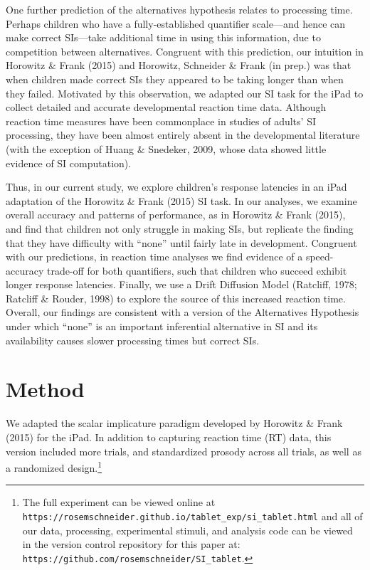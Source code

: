 \documentclass[10pt, letterpaper]{article}
\begin{document}
One further prediction of the alternatives hypothesis relates to
processing time. Perhaps children who have a fully-established
quantifier scale---and hence can make correct SIs---take additional time
in using this information, due to competition between alternatives.
Congruent with this prediction, our intuition in Horowitz \& Frank
(2015) and Horowitz, Schneider \& Frank (in prep.) was that when
children made correct SIs they appeared to be taking longer than when
they failed. Motivated by this observation, we adapted our SI task for
the iPad to collect detailed and accurate developmental reaction time
data. Although reaction time measures have been commonplace in studies
of adults' SI processing, they have been almost entirely absent in the
developmental literature (with the exception of Huang \& Snedeker, 2009,
whose data showed little evidence of SI computation).

Thus, in our current study, we explore children's response latencies in
an iPad adaptation of the Horowitz \& Frank (2015) SI task. In our
analyses, we examine overall accuracy and patterns of performance, as in
Horowitz \& Frank (2015), and find that children not only struggle in
making SIs, but replicate the finding that they have difficulty with
``none'' until fairly late in development. Congruent with our
predictions, in reaction time analyses we find evidence of a
speed-accuracy trade-off for both quantifiers, such that children who
succeed exhibit longer response latencies. Finally, we use a Drift
Diffusion Model (Ratcliff, 1978; Ratcliff \& Rouder, 1998) to explore
the source of this increased reaction time. Overall, our findings are
consistent with a version of the Alternatives Hypothesis under which
``none'' is an important inferential alternative in SI and its
availability causes slower processing times but correct SIs.

\section{Method}\label{method}

We adapted the scalar implicature paradigm developed by Horowitz \&
Frank (2015) for the iPad. In addition to capturing reaction time (RT)
data, this version included more trials, and standardized prosody across
all trials, as well as a randomized
design.\footnote{The full experiment can be viewed online at \texttt{https://rosemschneider.github.io/tablet\_exp/si\_tablet.html} and all of our data, processing, experimental stimuli, and analysis code can be viewed in the version control repository for this paper at: \texttt{https://github.com/rosemschneider/SI\_tablet}.}
\end{document}
